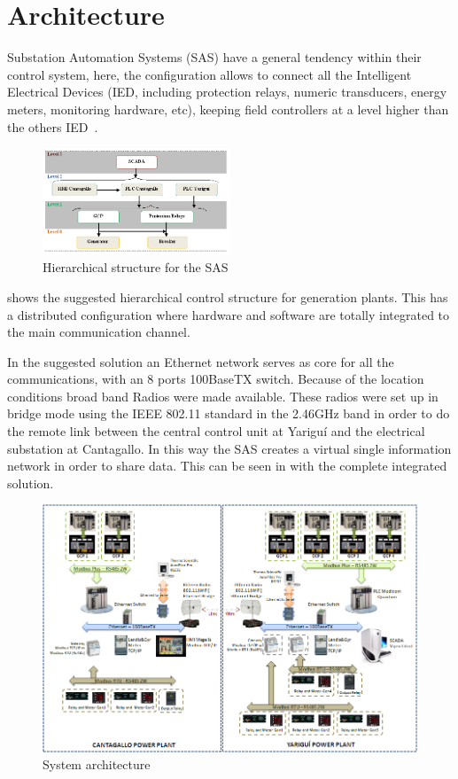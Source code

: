 
\section{Architecture}

Substation Automation Systems (SAS) have a general tendency
within their control system, here, the configuration allows to connect
all the Intelligent Electrical Devices (IED, including protection relays,
numeric transducers, energy meters, monitoring hardware, etc), keeping
field controllers at a level higher than the others
IED~\cite{rodriguez:2007}.

\begin{figure}
  \centering
  \includegraphics[width=0.5\textwidth]{img/sas.png}
  \caption{Hierarchical structure for the SAS}
  \label{fig:sas}
\end{figure}

 shows the suggested hierarchical control structure for
generation plants. This has a distributed configuration where hardware
and software are totally integrated to the main communication channel.

In the suggested solution an Ethernet network serves as core for all
the communications, with an 8 ports 100BaseTX switch. Because of the
location conditions broad band Radios were made available. These radios 
were set up in bridge mode using the IEEE 802.11 standard in the 2.46GHz 
band in order to do the remote link between the central control unit at
Yariguí and the electrical substation at Cantagallo. In this way the SAS
creates a virtual single information network in order to share data.
This can be seen in  with the complete integrated solution.

\begin{figure}
  \centering
  \includegraphics[width=1.0\textwidth]{img/arch.png}
  \caption{System architecture}
  \label{fig:arch}
\end{figure}

